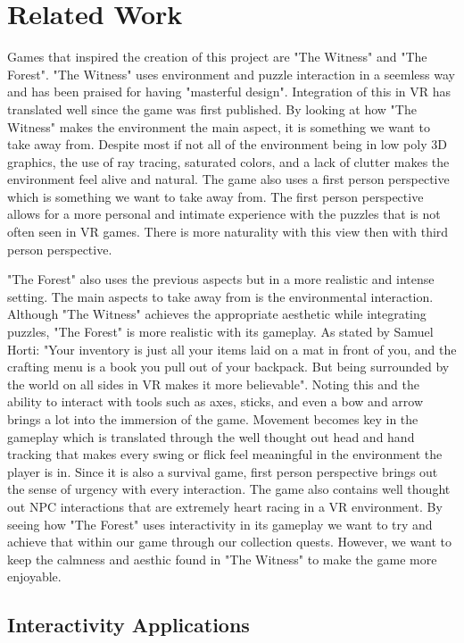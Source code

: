 \documentclass{vgtc}                          %
\begin{document}
\section{Related Work}
Games that inspired the creation of this project are "The Witness"\cite{rad_2016} and "The Forest"\cite{hafer_2018,horti_2018}. "The Witness" uses environment and puzzle interaction in a seemless way and has been praised for having "masterful design"\cite{rad_2016}.
Integration of this in VR has translated well since the game was first published. By looking at how "The Witness" makes the environment the main aspect, it is something we want to take away from. Despite most if not all of the environment being in low poly 3D graphics, the
use of ray tracing, saturated colors, and a lack of clutter makes the environment feel alive and natural. The game also uses a first person perspective which is something we want to take away from. The first person perspective allows for a more
personal and intimate experience with the puzzles that is not often seen in VR games. There is more naturality with this view then with third person perspective.

"The Forest" also uses the previous aspects but in a more realistic and intense setting. The main aspects to take away from is the environmental interaction. Although "The Witness" achieves the appropriate aesthetic while integrating puzzles, "The Forest"
is more realistic with its gameplay. As stated by Samuel Horti: "Your inventory is just all your items laid on a mat in front of you, and the crafting menu is a book you pull out of your backpack. But being surrounded by the world on all sides in VR makes it more believable"\cite{horti_2018}.
Noting this and the ability to interact with tools such as axes, sticks, and even a bow and arrow brings a lot into the immersion of the game. Movement becomes key in the gameplay which is translated through the well thought out head and hand tracking
that makes every swing or flick feel meaningful in the environment the player is in. Since it is also a survival game, first person perspective brings out the sense of urgency
with every interaction. The game also contains well thought out NPC interactions that are extremely heart racing in a VR environment. By seeing how "The Forest" uses interactivity in its gameplay we want to try and achieve that within our game through our collection
quests. However, we want to keep the calmness and aesthic found in "The Witness" to make the game more enjoyable.

\subsection*{Interactivity Applications}
\end{document}
